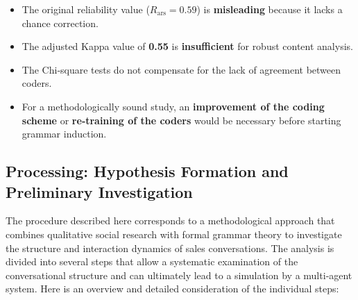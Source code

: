 \documentclass[
]{article}
\begin{document}
\begin{itemize}
\item The original reliability value (\(R_{\text{ars}} = 0.59\)) is \textbf{misleading} because it lacks a chance correction.
\item The adjusted Kappa value of \textbf{0.55} is \textbf{insufficient} for robust content analysis.
\item The Chi‑square tests do not compensate for the lack of agreement between coders.
\item For a methodologically sound study, an \textbf{improvement of the coding scheme} or \textbf{re‑training of the coders} would be necessary before starting grammar induction.
\end{itemize}

\subsection{Processing: Hypothesis Formation and Preliminary Investigation}\label{processing-hypothesis-formation-and-preliminary-investigation}

The procedure described here corresponds to a methodological approach that combines qualitative social research with formal grammar theory to investigate the structure and interaction dynamics of sales conversations. The analysis is divided into several steps that allow a systematic examination of the conversational structure and can ultimately lead to a simulation by a multi‑agent system. Here is an overview and detailed consideration of the individual steps:
\end{document}
